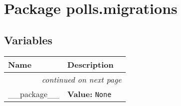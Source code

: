 %
%
%


\section{Package polls.migrations}

    \label{polls:migrations}


  \subsection{Variables}

    \vspace{-1cm}
\hspace{\varindent}\begin{longtable}{|p{\varnamewidth}|p{\vardescrwidth}|l}
\cline{1-2}
\cline{1-2} \centering \textbf{Name} & \centering \textbf{Description}& \\
\cline{1-2}
\endhead\cline{1-2}\multicolumn{3}{r}{\small\textit{continued on next page}}\\\endfoot\cline{1-2}
\endlastfoot\raggedright \_\-\_\-p\-a\-c\-k\-a\-g\-e\-\_\-\_\- & \raggedright \textbf{Value:} 
{\tt None}&\\
\cline{1-2}
\end{longtable}

